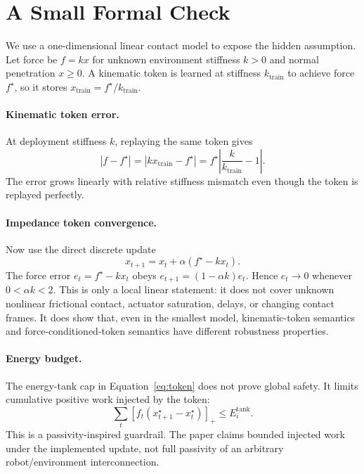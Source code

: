 \documentclass{article}
\newcommand{\ftarget}{f^\star}
\newcommand{\xtrain}{x_{\mathrm{train}}}
\newcommand{\ktrain}{k_{\mathrm{train}}}
\newcommand{\etank}{E^{\mathrm{tank}}}
\begin{document}
\section{A Small Formal Check}

We use a one-dimensional linear contact model to expose the hidden assumption. Let force be $f=kx$ for unknown environment stiffness $k>0$ and normal penetration $x \geq 0$. A kinematic token is learned at stiffness $\ktrain$ to achieve force $\ftarget$, so it stores $\xtrain=\ftarget/\ktrain$.

\paragraph{Kinematic token error.}
At deployment stiffness $k$, replaying the same token gives
\begin{equation}
    |f-\ftarget|
    = |k\xtrain-\ftarget|
    = \ftarget \left| \frac{k}{\ktrain} - 1 \right|.
    \label{eq:kinerror}
\end{equation}
The error grows linearly with relative stiffness mismatch even though the token is replayed perfectly.

\paragraph{Impedance token convergence.}
Now use the direct discrete update
\begin{equation}
    x_{t+1} = x_t + \alpha(\ftarget - kx_t).
    \label{eq:direct}
\end{equation}
The force error $e_t=\ftarget-kx_t$ obeys $e_{t+1}=(1-\alpha k)e_t$. Hence $e_t \to 0$ whenever $0<\alpha k<2$. This is only a local linear statement: it does not cover unknown nonlinear frictional contact, actuator saturation, delays, or changing contact frames. It does show that, even in the smallest model, kinematic-token semantics and force-conditioned-token semantics have different robustness properties.

\paragraph{Energy budget.}
The energy-tank cap in Equation~\ref{eq:token} does not prove global safety. It limits cumulative positive work injected by the token:
\[
    \sum_t [f_t(x_{t+1}^{\star}-x_t^{\star})]_+ \leq \etank_i .
\]
This is a passivity-inspired guardrail. The paper claims bounded injected work under the implemented update, not full passivity of an arbitrary robot/environment interconnection.
\end{document}
